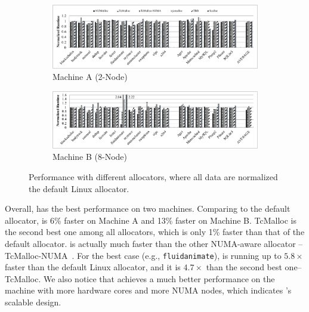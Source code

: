\begin{figure}[!ht]
    \centering
    \begin{subfigure}{0.9\textwidth}
    \includegraphics[width=\textwidth]{figure/2-node-parsec-perf.pdf}
    \caption{Machine A (2-Node)\label{2node-parsec-perf}}
    \end{subfigure}
    
	\vspace{0.1in}  
	
	\begin{subfigure}{0.9\textwidth}    \includegraphics[width=\textwidth]{figure/8-node-parsec-perf.pdf}
    \caption{Machine B (8-Node)\label{8node-parsec-perf}}
    \end{subfigure}
    \caption{Performance with different allocators, where all data are normalized the default Linux allocator. \label{sec:perf}}
 \end{figure}


Overall, \NM{} has the best performance on two machines. Comparing to the default allocator, \NM{} is 6\% faster on Machine A and 13\% faster on Machine B. TcMalloc is the second best one among all allocators, which is only 1\% faster than that of the default allocator. \NM{} is actually much faster than the other NUMA-aware allocator -- TcMalloc-NUMA~\cite{tcmallocnew}. For the best case (e.g., \texttt{fluidanimate}), \NM{} is running up to  $5.8\times$ faster than the default Linux allocator, and it is $4.7\times$ than the second best one--TcMalloc. We also notice that \NM{} achieves a much better performance on the machine with more hardware cores and more NUMA nodes, which indicates \NM{}'s scalable design. 

